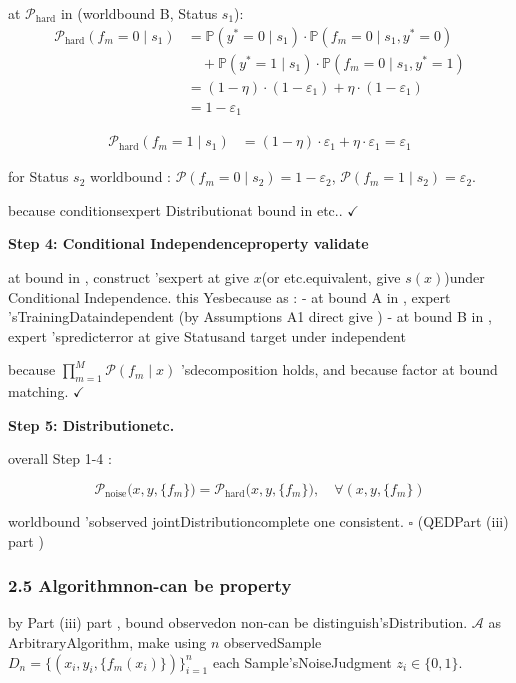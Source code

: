 \documentclass[
  12pt,
]{article}
\begin{document}
at  \(\mathcal{P}_{\text{hard}}\) in (worldbound  B, Status \(s_1\)):
\[\begin{aligned}
\mathcal{P}_{\text{hard}}(f_m = 0 \mid s_1) &= \mathbb{P}(y^* = 0 \mid s_1) \cdot \mathbb{P}(f_m = 0 \mid s_1, y^* = 0) \\
&\quad + \mathbb{P}(y^* = 1 \mid s_1) \cdot \mathbb{P}(f_m = 0 \mid s_1, y^* = 1) \\
&= (1 - \eta) \cdot (1 - \varepsilon_1) + \eta \cdot (1 - \varepsilon_1) \\
&= 1 - \varepsilon_1
\end{aligned}\]

\[\begin{aligned}
\mathcal{P}_{\text{hard}}(f_m = 1 \mid s_1) &= (1 - \eta) \cdot \varepsilon_1 + \eta \cdot \varepsilon_1 = \varepsilon_1
\end{aligned}\]

for Status \(s_2\)
worldbound : \(\mathcal{P}(f_m = 0 \mid s_2) = 1 - \varepsilon_2\), \(\mathcal{P}(f_m = 1 \mid s_2) = \varepsilon_2\). 

because conditionsexpert Distributionat bound in etc.. \(\checkmark\)

\textbf{Step 4: Conditional Independenceproperty validate }

at bound in , construct 'sexpert at give  \(x\)(or etc.equivalent, give 
\(s(x)\))under Conditional Independence. this Yesbecause as :  - at bound  A
in , expert 'sTrainingDataindependent (by Assumptions A1 direct give ) - at bound  B
in , expert 'spredicterror at give Statusand target under independent 

because  \(\prod_{m=1}^M \mathcal{P}(f_m \mid x)\)
'sdecomposition holds, and because factor at bound matching. \(\checkmark\)

\textbf{Step 5: Distributionetc.}

overall Step 1-4 : 

\[\mathcal{P}_{\text{noise}}\bigl(x, y, \{f_m\}\bigr) = \mathcal{P}_{\text{hard}}\bigl(x, y, \{f_m\}\bigr), \quad \forall (x, y, \{f_m\})\]

worldbound 'sobserved jointDistributioncomplete one consistent. \(\square\) (QEDPart (iii) part )

\subsubsection{2.5
Algorithmnon-can be property }\label{ux7b97ux6cd5ux4e0dux53efux533aux5206ux6027}

by Part (iii) part , bound observedon non-can be distinguish'sDistribution.  \(\mathcal{A}\)
as ArbitraryAlgorithm, make using  \(n\) observedSample
\(D_n = \{(x_i, y_i, \{f_m(x_i)\})\}_{i=1}^n\) each Sample'sNoiseJudgment
\(z_i \in \{0, 1\}\). 
\end{document}

